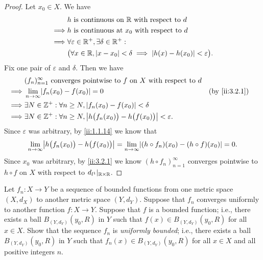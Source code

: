 \begin{proof}
  Let \(x_0 \in X\).
  We have
  \begin{align*}
             & h \text{ is continuous on } \mathbb{R} \text{ with respect to } d                                      \\
    \implies & h \text{ is continuous at } x_0 \text{ with respect to } d                                     \\
    \implies & \forall \varepsilon \in \mathbb{R}^+, \exists \delta \in \mathbb{R}^+ :                                        \\
             & \big(\forall x \in \mathbb{R}, \left\lvert x - x_0\right\rvert < \delta \implies \left\lvert h(x) - h(x_0)\right\rvert < \varepsilon\big).
  \end{align*}
  Fix one pair of \(\varepsilon\) and \(\delta\).
  Then we have
  \begin{align*}
             & (f_n)_{n = 1}^\infty \text{ converges pointwise to } f \text{ on } X \text{ with respect to } d                        \\
    \implies & \lim_{n \to \infty} \abs{f_n(x_0) - f(x_0)} = 0                                                     &  & \by{ii:3.2.1} \\
    \implies & \exists N \in \Z^+ : \forall n \geq N, \abs{f_n(x_0) - f(x_0)} < \delta                                                \\
    \implies & \exists N \in \Z^+ : \forall n \geq N, \abs{h\big(f_n(x_0)\big) - h\big(f(x_0)\big)} < \varepsilon.
  \end{align*}
  Since \(\varepsilon\) was arbitrary, by \cref{ii:1.1.14} we know that
  \[
    \lim_{n \to \infty} \abs{h\big(f_n(x_0)\big) - h\big(f(x_0)\big)} = \lim_{n \to \infty} \abs{(h \circ f_n)(x_0) - (h \circ f)(x_0)} = 0.
  \]
  Since \(x_0\) was arbitrary, by \cref{ii:3.2.1} we know \((h \circ f_n)_{n = 1}^\infty\) converges pointwise to \(h \circ f\) on \(X\) with respect to \(d_{l^1}|_{\mathbb{R} \times \mathbb{R}}\).
\end{proof}

\begin{ex}\label{ii:ex:3.2.4}
  Let \(f_n : X \to Y\) be a sequence of bounded functions from one metric space \((X, d_X)\) to another metric space \((Y, d_Y)\).
  Suppose that \(f_n\) converges uniformly to another function \(f : X \to Y\).
  Suppose that \(f\) is a bounded function;
  i.e., there exists a ball \(B_{(Y, d_Y)}(y_0, R)\) in \(Y\) such that \(f(x) \in B_{(Y, d_Y)}(y_0, R)\) for all \(x \in X\).
  Show that the sequence \(f_n\) is \emph{uniformly bounded};
  i.e., there exists a ball \(B_{(Y, d_Y)}(y_0, R)\) in \(Y\) such that \(f_n(x) \in B_{(Y, d_Y)}(y_0, R)\) for all \(x \in X\) and all positive integers \(n\).
\end{ex}

